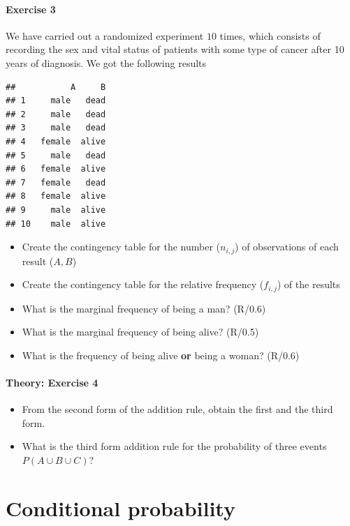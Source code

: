 \documentclass[
]{book}
\providecommand{\tightlist}{%
  \setlength{\itemsep}{0pt}\setlength{\parskip}{0pt}}
\begin{document}
\hypertarget{exercise-3}{%
\subsubsection{Exercise 3}\label{exercise-3}}

We have carried out a randomized experiment \(10\) times, which consists of recording the sex and vital status of patients with some type of cancer after 10 years of diagnosis. We got the following results

\begin{verbatim}
##           A     B
## 1     male   dead
## 2     male   dead
## 3     male   dead
## 4   female  alive
## 5     male   dead
## 6   female  alive
## 7   female   dead
## 8   female  alive
## 9     male  alive
## 10    male  alive
\end{verbatim}

\begin{itemize}
\tightlist
\item
  Create the contingency table for the number (\(n_{ i,j }\)) of observations of each result (\(A,B\))
\item
  Create the contingency table for the relative frequency (\(f_{ i,j }\)) of the results
\item
  What is the marginal frequency of being a man? (R/0.6)
\item
  What is the marginal frequency of being alive? (R/0.5)
\item
  What is the frequency of being alive \textbf{or} being a woman? (R/0.6)
\end{itemize}

\hypertarget{theory-exercise-4}{%
\subsubsection{Theory: Exercise 4}\label{theory-exercise-4}}

\begin{itemize}
\item
  From the second form of the addition rule, obtain the first and the third form.
\item
  What is the third form addition rule for the probability of three events \(P(A \cup B \cup C)\)?
\end{itemize}

\hypertarget{conditional-probability}{%
\chapter{Conditional probability}\label{conditional-probability}}
\end{document}
